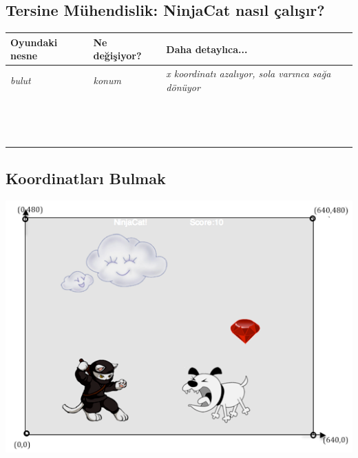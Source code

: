 \documentclass[12pt, a4paper]{article}
\begin{document}
\subsection*{Tersine Mühendislik: NinjaCat nasıl çalışır?}
\begin{tabular}{| p{4cm} | p{4cm} | p{8cm} |  }
\hline			
\bf Oyundaki nesne&\bf Ne değişiyor?&\bf Daha detaylıca...\\
\hline
\textit{bulut}&\textit{konum} &\textit{x koordinatı azalıyor, sola varınca sağa dönüyor} \\[2ex]
\hline  
 & &  \\[4ex]
\hline  
 & &  \\[4ex]
\hline  
 & &  \\[4ex]
\hline  
 & &  \\[4ex]
\hline  
 & &  \\[4ex]
\hline  
 & &  \\[4ex]
\hline  
 & &  \\[4ex]
\hline  
 & &  \\[4ex]
\hline  
 & &  \\[4ex]
\hline  
 & &  \\[4ex]
\hline  
 & &  \\[4ex]
\hline  
 & &  \\[4ex]
\hline  
 & &  \\[4ex]
\hline  
 & &  \\[4ex]
\hline
\end{tabular}


\newpage
\subsection*{Koordinatları Bulmak}
\includegraphics[width=1\linewidth]{ninja-sahne.png}
\end{document}
